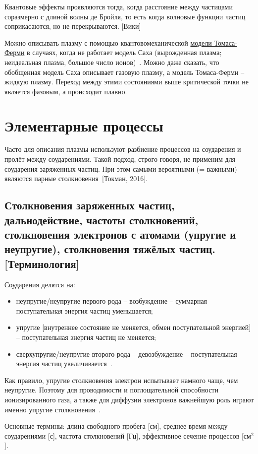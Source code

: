 \documentclass[10pt, a4paper]{article}
\newcommand{\Tokman}{~[Токман, 2016]}
\let\stdsection\section
\renewcommand\section{\newpage\stdsection}
\begin{document}
Квантовые эффекты проявляются тогда, когда расстояние между частицами соразмерно с длиной волны де Бройля, то есть когда волновые функции частиц соприкасаются, но не перекрываются. [Вики]

Можно описывать плазму с помощью квантовомеханической \uline{модели Томаса-Ферми} в случаях, когда не работает модель Саха (вырожденная плазма; неидеальная плазма, большое число ионов)~\cite{kalitkin}. Можно даже сказать, что обобщенная модель Саха описывает газовую плазму, а модель Томаса-Ферми -- жидкую плазму. Переход между этими состояниями выше критической точки не является фазовым, а происходит плавно. 

\section{Элементарные процессы}

Часто для описания плазмы используют разбиение процессов на соударения и пролёт между соударениями. Такой подход, строго говоря, не применим для соударения заряженных частиц. При этом самыми вероятными (= важными) являются парные столкновения\Tokman. 

\subsection{Столкновения заряженных частиц, дальнодействие, частоты столкновений, столкновения электронов с атомами (упругие и неупругие), столкновения тяжёлых частиц. [Терминология]}

Соударения делятся на:
\begin{itemize}
	\item неупругие/неупругие первого рода -- возбуждение -- суммарная поступательная энергия частиц уменьшается;
	\item упругие [внутреннее состояние не меняется, обмен поступательной энергией] -- поступательная энергия частиц не меняется;
	\item сверхупругие/неупругие второго рода -- девозбуждение -- поступательная энергия частиц увеличивается~\cite{raizer}.
\end{itemize}

Как правило, упругие столкновения электрон испытывает намного чаще, чем неупругие. Поэтому для проводимости и поглощательной способности ионизированного газа, а также для диффузии электронов важнейшую роль играют именно упругие столкновения~\cite{raizer}.

Основные термины: длина свободного пробега [см], среднее время между соударениями [с], частота столкновений [Гц], эффективное сечение процессов [см$^2$]. 
\end{document}
